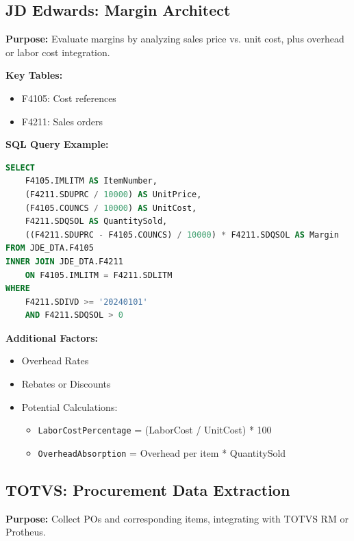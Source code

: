 \documentclass[a4paper,10pt]{article}
\begin{document}
\subsection{JD Edwards: Margin Architect}
\textbf{Purpose:} Evaluate margins by analyzing sales price vs. unit cost, plus overhead or labor cost integration.

\textbf{Key Tables:}
\begin{itemize}[leftmargin=2em]
    \item F4105: Cost references
    \item F4211: Sales orders
\end{itemize}

\textbf{SQL Query Example:}
\begin{lstlisting}[language=SQL]
SELECT
    F4105.IMLITM AS ItemNumber,
    (F4211.SDUPRC / 10000) AS UnitPrice,
    (F4105.COUNCS / 10000) AS UnitCost,
    F4211.SDQSOL AS QuantitySold,
    ((F4211.SDUPRC - F4105.COUNCS) / 10000) * F4211.SDQSOL AS Margin
FROM JDE_DTA.F4105
INNER JOIN JDE_DTA.F4211
    ON F4105.IMLITM = F4211.SDLITM
WHERE
    F4211.SDIVD >= '20240101'
    AND F4211.SDQSOL > 0
\end{lstlisting}

\textbf{Additional Factors:}
\begin{itemize}[leftmargin=2em]
    \item Overhead Rates
    \item Rebates or Discounts
    \item Potential Calculations:
    \begin{itemize}[leftmargin=1.5em]
        \item \texttt{LaborCostPercentage} = (LaborCost / UnitCost) * 100
        \item \texttt{OverheadAbsorption} = Overhead per item * QuantitySold
    \end{itemize}
\end{itemize}

\subsection{TOTVS: Procurement Data Extraction}
\textbf{Purpose:} Collect POs and corresponding items, integrating with TOTVS RM or Protheus.
\end{document}
